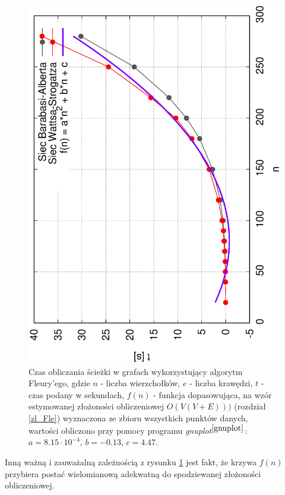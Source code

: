 \documentclass[a4paper, 12pt, twoside, openright]{article}
\begin{document}
\begin{figure}[h]
	\centering
	\includegraphics[angle=270,width=1\textwidth]{img/wyniki/Fleury_n}
	\caption[]{Czas obliczania ścieżki w grafach wykorzystujący algorytm Fleury'ego, gdzie $n$ - liczba wierzchołków, $e$ - liczba krawędzi, $t$ - czas podany w sekundach, $f(n)$ - funkcja dopasowująca, na wzór estymowanej złożoności obliczeniowej $O(V(V+E)))$ (rozdział \ref{zl_Fle}) wyznaczona ze zbioru wszystkich punktów danych, wartości obliczono przy pomocy programu \textit{gnuplot}$^{\cite{gnuplot}}$: $a = 8.15 \cdot 10^{-4}$, $b = - 0.13$, $c = 4.47$.}
	\label{fle_n}
\end{figure}

	Inną ważną i zauważalną zależnością z rysunku \ref{fle_n} jest fakt, że krzywa $f(n)$ przybiera postać wielomianową adekwatną do spodziewanej złożoności obliczeniowej.
\end{document}
